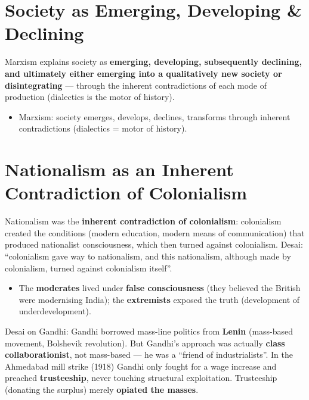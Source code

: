 \section{Society as Emerging, Developing \& Declining}

Marxism explains society as \textbf{emerging, developing, subsequently declining, and ultimately either emerging into a qualitatively new society or disintegrating} --- through the inherent contradictions of each mode of production (dialectics is the motor of history).

\begin{QuickRevision}
\begin{itemize}
\item Marxism: society emerges, develops, declines, transforms through inherent contradictions (dialectics = motor of history).
\end{itemize}
\end{QuickRevision}

\section{Nationalism as an Inherent Contradiction of Colonialism}

Nationalism was the \textbf{inherent contradiction of colonialism}: colonialism created the conditions (modern education, modern means of communication) that produced nationalist consciousness, which then turned against colonialism. Desai: ``colonialism gave way to nationalism, and this nationalism, although made by colonialism, turned against colonialism itself''.

\begin{itemize}
\item The \textbf{moderates} lived under \textbf{false consciousness} (they believed the British were modernising India); the \textbf{extremists} exposed the truth (development of underdevelopment).
\end{itemize}

\begin{CriticalPoint}
Desai on Gandhi: Gandhi borrowed mass-line politics from \textbf{Lenin} (mass-based movement, Bolshevik revolution). But Gandhi's approach was actually \textbf{class collaborationist}, not mass-based --- he was a ``friend of industrialists''. In the Ahmedabad mill strike (1918) Gandhi only fought for a wage increase and preached \textbf{trusteeship}, never touching structural exploitation. Trusteeship (donating the surplus) merely \textbf{opiated the masses}.
\end{CriticalPoint}


